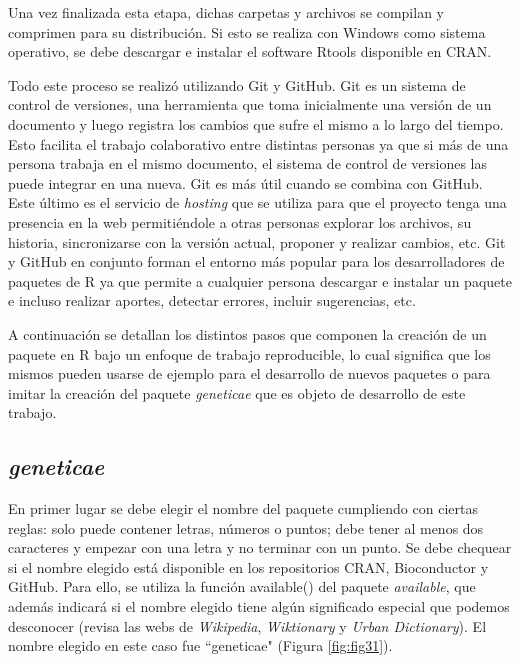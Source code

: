 Una vez finalizada esta etapa, dichas carpetas y archivos se compilan y comprimen para su distribución. Si esto se realiza con Windows como sistema operativo, se debe descargar e instalar el software Rtools disponible en CRAN. 

Todo este proceso se realizó utilizando Git y GitHub. Git es un sistema de control de versiones, una herramienta que toma inicialmente una versión de un documento y luego registra los cambios que sufre el mismo a lo largo del tiempo. Esto facilita el trabajo colaborativo entre distintas personas ya que si más de una persona trabaja en el mismo documento, el sistema de control de versiones las puede integrar en una nueva. Git es más útil cuando se combina con GitHub. Este último es el servicio de \emph{hosting} que se utiliza para que el proyecto tenga una presencia en la web permitiéndole a otras personas explorar los archivos, su historia, sincronizarse con la versión actual, proponer y realizar cambios, etc. Git y GitHub en conjunto forman el entorno más popular para los desarrolladores de paquetes de R ya que permite a cualquier persona descargar e instalar un paquete e incluso realizar aportes, detectar errores, incluir sugerencias, etc.


A continuación se detallan los distintos pasos que componen la creación de un paquete en R bajo un enfoque de trabajo reproducible, lo cual significa que los mismos pueden usarse de ejemplo para el desarrollo de nuevos paquetes o para imitar la creación del paquete \emph{geneticae} que es objeto de desarrollo de este trabajo. 

\subsection{\emph{geneticae}}

En primer lugar se debe elegir el nombre del paquete cumpliendo con ciertas reglas: solo puede contener letras, números o puntos; debe tener al menos dos caracteres y empezar con una letra y no terminar con un punto. Se debe chequear si el nombre elegido está disponible en los repositorios  CRAN, Bioconductor y GitHub. Para ello, se utiliza la función \textcolor{fandango}{available()} del paquete \emph{available}, que además indicará si el nombre elegido tiene algún significado especial que podemos desconocer (revisa las webs de \emph{Wikipedia}, \emph{Wiktionary} y \emph{Urban Dictionary}). El nombre elegido en este caso fue ``geneticae"  (Figura \ref{fig:fig31}). 

